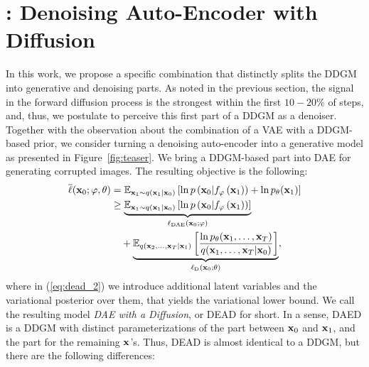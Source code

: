 \section{\ours{}: Denoising Auto-Encoder with Diffusion}

In this work, we propose a specific combination that distinctly splits the DDGM into generative and denoising parts. As noted in the previous section, the signal in the forward diffusion process is the strongest within the first $10-20\%$ of steps, and, thus, we postulate to perceive this first part of a DDGM as a denoiser. 
Together with the observation about the combination of a VAE with a DDGM-based prior, we consider turning a denoising auto-encoder into a generative model as presented in Figure~\ref{fig:teaser}. We bring a DDGM-based part into DAE for generating corrupted images. The resulting objective is the following:
\begin{align}
    \overline{\ell}(\rvx_0;\varphi, \theta) &= \mathbb{E}_{\rvx_1 \sim q(\rvx_1 | \rvx_0)}\left[\ln p\left(\rvx_0 | f_{\varphi}\left(\rvx_1\right)\right) + \ln p_{\theta}(\rvx_1)\right] \label{eq:daed_1}\\ 
    &\geq \underbrace{\mathbb{E}_{\rvx_1 \sim q(\rvx_1 | \rvx_0)}\left[\ln p\left(\rvx_0 | f_{\varphi}\left(\rvx_1\right)\right)\right]}_{\ell_{\text{DAE}}(\rvx_0;\varphi)} \\
    &\quad + \underbrace{\mathbb{E}_{q(\rvx_2, \ldots , \rvx_T | \rvx_1)} \left[ \frac{\ln p_{\theta}(\rvx_1, \ldots, \rvx_T)}{q(\rvx_1, \ldots , \rvx_T | \rvx_0)} \right]}_{\ell_{\text{D}}(\rvx_0;\theta)} \label{eq:dead_2},
\end{align}
where in (\ref{eq:dead_2}) we introduce additional latent variables and the variational posterior over them, that yields the variational lower bound. We call the resulting model \textit{DAE with a Diffusion}, or DEAD for short. In a sense, DAED is a DDGM with distinct parameterizations of the part between ${\mathbf{x}}_0$ and ${\mathbf{x}}_1$, and the part for the remaining ${\mathbf{x}}$'s. Thus, DEAD is almost identical to a DDGM, but there are the following differences:
